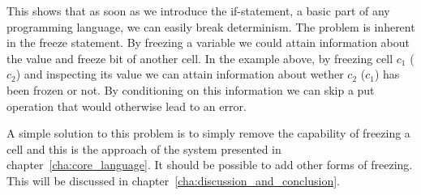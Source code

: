 This shows that as soon as we introduce the if-statement, a basic part of any
programming language, we can easily break determinism. The problem is inherent
in the freeze statement. By freezing a variable we could attain information
about the value and freeze bit of another cell. In the example above, by
freezing cell $c_1$ ($c_2$) and inspecting its value we can attain information
about wether $c_2$ ($c_1$) has been frozen or not. By conditioning on this
information we can skip a put operation that would otherwise lead to an error.

A simple solution to this problem is to simply remove the capability of freezing
a cell and this is the approach of the system presented in
chapter~\ref{cha:core_language}. It should be possible to add other
forms of freezing. This will be discussed in
chapter~\ref{cha:discussion_and_conclusion}.



